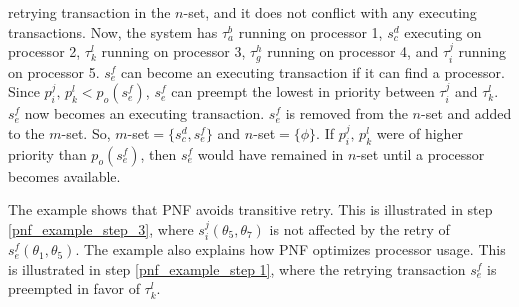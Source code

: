 \begin{compactenum}
retrying transaction in the $n$-set, and it does not conflict with
any executing transactions. Now, the system has $\tau_{a}^{b}$ running
on processor 1, $s_{c}^{d}$ executing on processor 2, $\tau_{k}^{l}$
running on processor 3, $\tau_{g}^{h}$ running on processor 4, and
$\tau_{i}^{j}$ running on processor 5. $s_{e}^{f}$ can become an
executing transaction if it can find a processor. 
%
Since $p_{i}^{j},\, p_{k}^{l}<p_{o}(s_{e}^{f})$,
$s_{e}^{f}$ can preempt the lowest in priority between $\tau_{i}^{j}$
and $\tau_{k}^{l}$. $s_{e}^{f}$ now becomes an executing transaction.
$s_{e}^{f}$ is removed from the $n$-set and added to the $m$-set.
So, $m$-set$=\{s_{c}^{d},s_{e}^{f}\}$ and $n$-set$=\{\phi\}$. If $p_{i}^{j},\, p_{k}^{l}$
were of higher priority than $p_{o}(s_{e}^{f})$, then $s_{e}^{f}$
would have remained in $n$-set until a processor becomes available.
%
\end{compactenum}
The  example shows that PNF avoids transitive retry. This is illustrated in step \ref{pnf_example_step_3}, where $s_{i}^{j}(\theta_{5},\theta_{7})$ is not affected by the  retry of $s_{e}^{f}(\theta_{1},\theta_{5})$. The example also explains how
PNF optimizes processor usage. This is illustrated in step \ref{pnf_example_step 1}, 
where the retrying transaction $s_{e}^{f}$ is preempted in favor of $\tau_{k}^{l}$.
%
